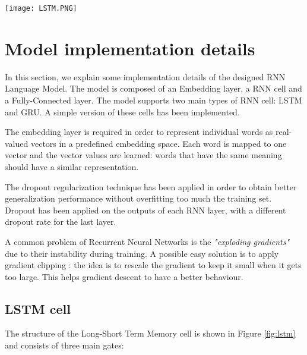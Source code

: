 
\begin{figure*}[t]
\centerline{\texttt{[image: LSTM.PNG]}}
\caption{Long-Short Term Memory cell structure and related equations \cite{LSTM_GRU_structure}.}
\label{fig:lstm}
\end{figure*}

\section{Model implementation details}

In this section, we explain some implementation details of the designed 
RNN Language Model. The model is composed of an Embedding layer, a RNN cell 
and a Fully-Connected layer. The model supports two main types of RNN cell: 
LSTM and GRU. A simple version of these cells has been implemented.

The embedding layer is required in order to represent individual words as
real-valued vectors in a predefined embedding space. Each word is mapped 
to one vector and the vector values are learned: words that have 
the same meaning should have a similar representation.

The dropout regularization technique \cite{dropout} has been applied in order
to obtain better generalization performance without overfitting too much the
training set. Dropout has been applied on the outputs of each RNN layer, with
a different dropout rate for the last layer.

A common problem of Recurrent Neural Networks is the \textit{"exploding gradients"} 
due to their instability during training.
A possible easy solution is to apply gradient clipping \cite{clip}: the idea is to
rescale the gradient to keep it small when it gets too large.
This helps gradient descent to have a better behaviour.

\subsection{LSTM cell}


The structure of the Long-Short Term Memory cell is shown in Figure \ref{fig:lstm}
and consists of three main gates:

